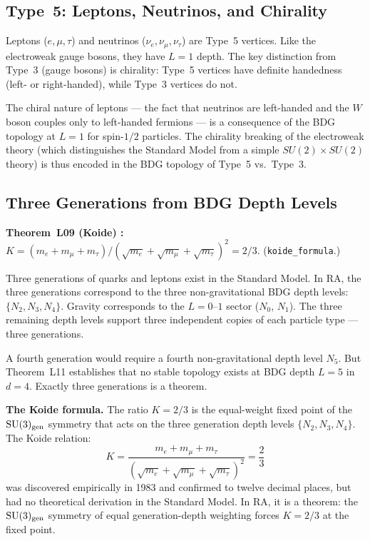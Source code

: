 \documentclass[12pt,a4paper]{article}
\begin{document}
\subsection{Type~5: Leptons, Neutrinos, and Chirality}

Leptons ($e,\mu,\tau$) and neutrinos ($\nu_e,\nu_\mu,\nu_\tau$) are Type~5 vertices.  Like the electroweak gauge bosons, they have $L=1$ depth.  The key distinction from Type~3 (gauge bosons) is chirality: Type~5 vertices have definite handedness (left- or right-handed), while Type~3 vertices do not.

The chiral nature of leptons --- the fact that neutrinos are left-handed and the $W$ boson couples only to left-handed fermions --- is a consequence of the BDG topology at $L=1$ for spin-$1/2$ particles.  The chirality breaking of the electroweak theory (which distinguishes the Standard Model from a simple $SU(2)\times SU(2)$ theory) is thus encoded in the BDG topology of Type~5 vs.\ Type~3.

\subsection{Three Generations from BDG Depth Levels}\label{sec:generations}

\begin{leanbox}
\textbf{Theorem~L09 (Koide) \statusLV:} $K=(m_e+m_\mu+m_\tau)/(\sqrt{m_e}+\sqrt{m_\mu}+\sqrt{m_\tau})^2=2/3$.  (\texttt{koide\_formula}.)
\end{leanbox}

Three generations of quarks and leptons exist in the Standard Model.  In RA, the three generations correspond to the three non-gravitational BDG depth levels: $\{N_2,N_3,N_4\}$.  Gravity corresponds to the $L=0$--$1$ sector ($N_0$, $N_1$).  The three remaining depth levels support three independent copies of each particle type --- three generations.

A fourth generation would require a fourth non-gravitational depth level $N_5$.  But Theorem~L11 establishes that no stable topology exists at BDG depth $L=5$ in $d=4$.  Exactly three generations is a theorem.

\textbf{The Koide formula.}  The ratio $K=2/3$ is the equal-weight fixed point of the $\mathrm{SU}(3)_{\rm gen}$ symmetry that acts on the three generation depth levels $\{N_2,N_3,N_4\}$.  The Koide relation:
\begin{equation}
  K = \frac{m_e+m_\mu+m_\tau}{(\sqrt{m_e}+\sqrt{m_\mu}+\sqrt{m_\tau})^2} = \frac{2}{3}
  \label{eq:koide}
\end{equation}
was discovered empirically in 1983 and confirmed to twelve decimal places, but had no theoretical derivation in the Standard Model.  In RA, it is a theorem: the $\mathrm{SU}(3)_{\rm gen}$ symmetry of equal generation-depth weighting forces $K=2/3$ at the fixed point.
\end{document}
